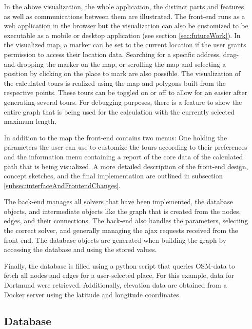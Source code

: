 In the above visualization, the whole application, the distinct parts and features as well as communications between them are illustrated. 
The front-end runs as a web application in the browser but the visualization can also be customized to be executable as a mobile or desktop application (see section \ref{sec:futureWork}). 
In the visualized map, a marker can be set to the current location if the user grants permission to access their location data.
Searching for a specific address, drag-and-dropping the marker on the map, or scrolling the map and selecting a position by clicking on the place to mark are also possible. 
The visualization of the calculated tours is realized using the map and polygons built from the respective points.
These tours can be toggled on or off to allow for an easier after generating several tours.
For debugging purposes, there is a feature to show the entire graph that is being used for the calculation with the currently selected maximum length.

In addition to the map the front-end contains two menus:
One holding the parameters the user can use to customize the tours according to their preferences and the information menu containing a report of the core data of the calculated path that is being visualized. 
A more detailed description of the front-end design, concept sketches, and the final implementation are outlined in subsection \ref{subsec:interfaceAndFrontendChanges}.

The back-end manages all solvers that have been implemented, the database objects, and intermediate objects like the graph that is created from the nodes, edges, and their connections. 
The back-end also handles the parameters, selecting the correct solver, and generally managing the ajax requests received from the front-end. 
The database objects are generated when building the graph by accessing the database and using the stored values.

Finally, the database is filled using a python script that queries OSM-data to fetch all nodes and edges for a user-selected place.
For this example, data for Dortmund were retrieved.
Additionally, elevation data are obtained from a Docker server using the latitude and longitude coordinates.



\subsection{Database}
\label{subsection:database}


